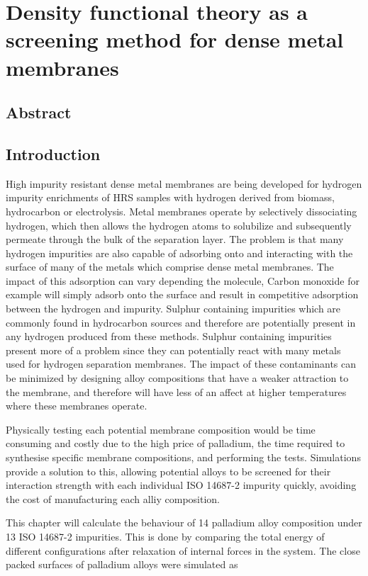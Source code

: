 \chapter{Density functional theory as a screening method for dense metal membranes}

\section{Abstract}

\section{Introduction}
High impurity resistant dense metal membranes are being developed for hydrogen impurity enrichments of HRS samples with hydrogen derived from biomass, hydrocarbon or electrolysis. Metal membranes operate by selectively dissociating hydrogen, which then allows the hydrogen atoms to solubilize and subsequently permeate through the bulk of the separation layer. The problem is that many hydrogen impurities are also capable of adsorbing onto and interacting with the surface of many of the metals which comprise dense metal membranes. The impact of this adsorption can vary depending the molecule, Carbon monoxide for example will simply adsorb onto the surface and result in competitive adsorption between the hydrogen and impurity. Sulphur containing impurities which are commonly found in hydrocarbon sources and therefore are potentially present in any hydrogen produced from these methods. Sulphur containing impurities present more of a problem since they can potentially react with many metals used for hydrogen separation membranes. The impact of these contaminants can be minimized by designing alloy compositions that have a weaker attraction to the membrane, and therefore will have less of an affect at higher temperatures where these membranes operate.

Physically testing each potential membrane composition would be time consuming and costly due to the high price of palladium, the time required to synthesise specific membrane compositions, and performing the tests. Simulations provide a solution to this, allowing potential alloys to be screened for their interaction strength with each individual ISO 14687-2 impurity quickly, avoiding the cost of manufacturing each alliy composition. 

This chapter will calculate the behaviour of 14 palladium alloy composition under 13 ISO 14687-2 impurities. This is done by comparing the total energy of different configurations after relaxation of internal forces in the system. The close packed surfaces of palladium alloys were simulated as 

